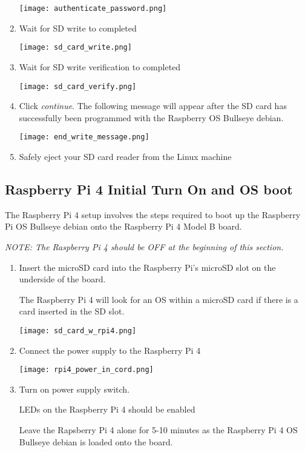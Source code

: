 \documentclass[journal]{IEEEtran}
\begin{document}
\begin{enumerate}
        \texttt{[image: authenticate\_password.png]}

        \item Wait for SD write to completed
        
        \texttt{[image: sd\_card\_write.png]}

        \item Wait for SD write verification to completed
        
        \texttt{[image: sd\_card\_verify.png]}

        \item Click \emph{continue}. The following message will appear after the SD card has successfully been programmed with the Raspberry OS Bullseye debian.
        
        \texttt{[image: end\_write\_message.png]}

        \item Safely eject your SD card reader from the Linux machine 

    \end{enumerate}

    \subsection{Raspberry Pi 4 Initial Turn On and OS boot}

    The Raspberry Pi 4 setup involves the steps required to boot up the Raspberry Pi OS Bullseye debian onto the Raspberry Pi 4 Model B board.

    \emph{NOTE: The Raspberry Pi 4 should be OFF at the beginning of this section.} \newline


    \begin{enumerate}
        \item Insert the microSD card into the Raspberry Pi's microSD slot on the underside of the board. \newline 
        
        The Raspberry Pi 4 will look for an OS within a microSD card if there is a card inserted in the SD slot. \newline

        \texttt{[image: sd\_card\_w\_rpi4.png]}

        \item Connect the power supply to the Raspberry Pi 4 \newline
        
        \texttt{[image: rpi4\_power\_in\_cord.png]}

        \item Turn on power supply switch. \newline
        
        LEDs on the Raspberry Pi 4 should be enabled \newline

        Leave the Rapsberry Pi 4 alone for 5-10 minutes as the Raspberry Pi 4 OS Bullseye debian is loaded onto the board.

    \end{enumerate}
\end{document}
